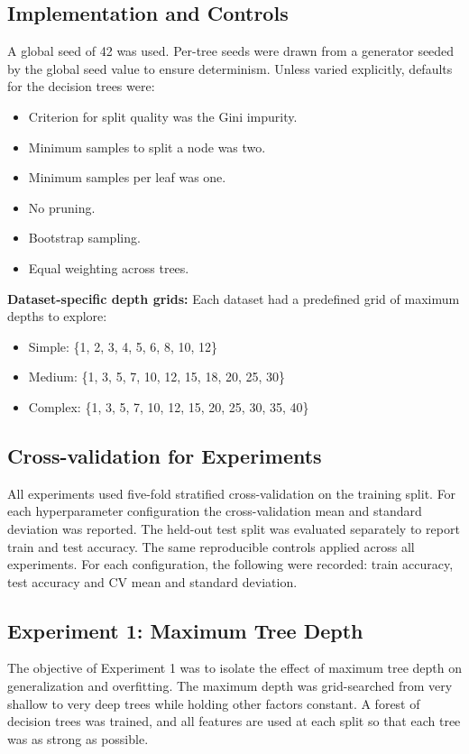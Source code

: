 \documentclass[conference]{IEEEtran}
\begin{document}
\subsection{Implementation and Controls}
A global seed of 42 was used. Per-tree seeds were drawn from a generator seeded by the global seed value to ensure determinism. Unless varied explicitly, defaults for the decision trees were:
\begin{itemize}
  \item Criterion for split quality was the Gini impurity.
  \item Minimum samples to split a node was two.
  \item Minimum samples per leaf was one.
  \item No pruning.
  \item Bootstrap sampling.
  \item Equal weighting across trees.
\end{itemize}

\textbf{Dataset-specific depth grids:} Each dataset had a predefined grid of maximum depths to explore:
\begin{itemize}
  \item Simple: \{1, 2, 3, 4, 5, 6, 8, 10, 12\}
  \item Medium: \{1, 3, 5, 7, 10, 12, 15, 18, 20, 25, 30\}
  \item Complex: \{1, 3, 5, 7, 10, 12, 15, 20, 25, 30, 35, 40\}
\end{itemize}

\subsection{Cross-validation for Experiments}
All experiments used five-fold stratified cross-validation on the training split. For each hyperparameter configuration the cross-validation mean and standard deviation was reported. The held-out test split was evaluated separately to report train and test accuracy. The same reproducible controls applied across all experiments. For each configuration, the following were recorded: train accuracy, test accuracy and CV mean and standard deviation. 

\subsection{Experiment 1: Maximum Tree Depth}
The objective of Experiment 1 was to isolate the effect of maximum tree depth on generalization and overfitting. The maximum depth was grid-searched from very shallow to very deep trees while holding other factors constant. A forest of decision trees was trained, and all features are used at each split so that each tree was as strong as possible.
\end{document}
